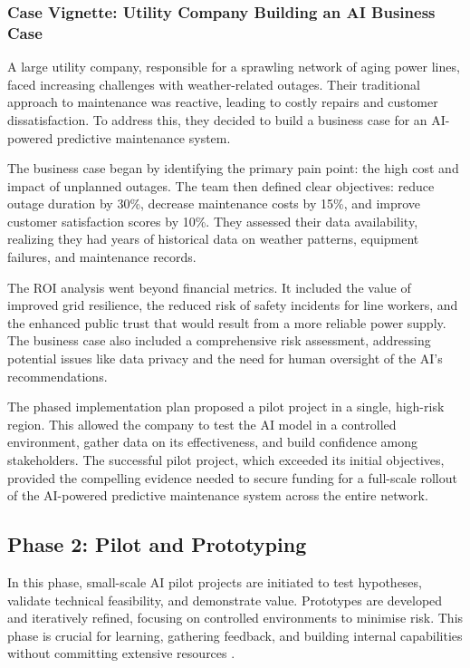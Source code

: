 \subsubsection{Case Vignette: Utility Company Building an AI Business Case}
A large utility company, responsible for a sprawling network of aging power lines, faced increasing challenges with weather-related outages. Their traditional approach to maintenance was reactive, leading to costly repairs and customer dissatisfaction. To address this, they decided to build a business case for an AI-powered predictive maintenance system.

The business case began by identifying the primary pain point: the high cost and impact of unplanned outages. The team then defined clear objectives: reduce outage duration by 30\%, decrease maintenance costs by 15\%, and improve customer satisfaction scores by 10\%. They assessed their data availability, realizing they had years of historical data on weather patterns, equipment failures, and maintenance records.

The ROI analysis went beyond financial metrics. It included the value of improved grid resilience, the reduced risk of safety incidents for line workers, and the enhanced public trust that would result from a more reliable power supply. The business case also included a comprehensive risk assessment, addressing potential issues like data privacy and the need for human oversight of the AI's recommendations.

The phased implementation plan proposed a pilot project in a single, high-risk region. This allowed the company to test the AI model in a controlled environment, gather data on its effectiveness, and build confidence among stakeholders. The successful pilot project, which exceeded its initial objectives, provided the compelling evidence needed to secure funding for a full-scale rollout of the AI-powered predictive maintenance system across the entire network.

\subsection{Phase 2: Pilot and Prototyping}

In this phase, small-scale AI pilot projects are initiated to test hypotheses, validate technical feasibility, and demonstrate value. Prototypes are developed and iteratively refined, focusing on controlled environments to minimise risk. This phase is crucial for learning, gathering feedback, and building internal capabilities without committing extensive resources \parencite{cisc2025artificial}.

